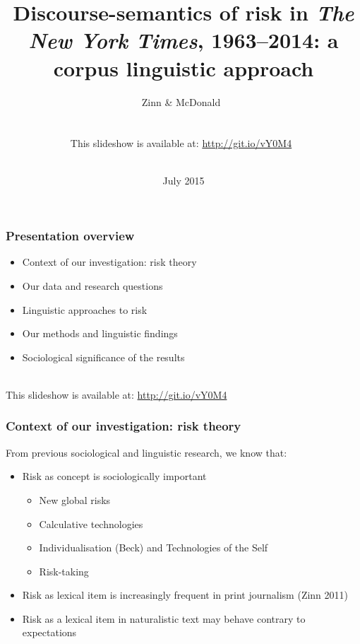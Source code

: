 \documentclass{beamer}       %
\title[ISFC Aachen 2015]{Discourse-semantics of risk in \emph{The New York Times}, 1963--2014: a corpus linguistic approach}
\author[Jens Zinn \and Daniel McDonald]{Zinn \& McDonald~\\~\\~\\This slideshow is available at: \url{http://git.io/vY0M4}~\\~\\}
\date{July 2015}
\begin{document}

\frame{\titlepage}


\begin{frame}
    \frametitle{Presentation overview}
    
    \begin{itemize}
    \item Context of our investigation: risk theory
    \item Our data and research questions
    \item Linguistic approaches to risk
    \item Our methods and linguistic findings
    \item Sociological significance of the results
    \end{itemize}

    ~\\ This slideshow is available at: \url{http://git.io/vY0M4}

\end{frame}


\begin{frame}
    \frametitle{Context of our investigation: risk theory}
    
    From previous sociological and linguistic research, we know that:

    \begin{itemize}
    \item Risk as concept is sociologically important
    \begin{itemize}
        \item New global risks \cite{beck_risk_1992}
        \item Calculative technologies \cite{dean_risk_1998,dean_governmentality:_2010}
        \item Individualisation (Beck) and Technologies of the Self \cite{foucault_technologies_1988}
        \item Risk-taking \cite{luhmann_risk:_1993}
    \end{itemize}
    \item Risk as lexical item is increasingly frequent in print journalism (Zinn 2011)
    \item Risk as a lexical item in naturalistic text may behave contrary to expectations \cite{hamilton_meanings_2007}
    \end{itemize}
\end{frame}
\end{document}
